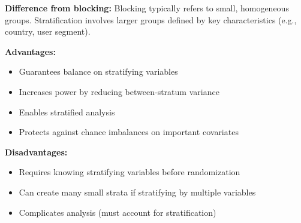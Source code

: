 \textbf{Difference from blocking:} Blocking typically refers to small, homogeneous groups. Stratification involves larger groups defined by key characteristics (e.g., country, user segment).

\textbf{Advantages:}
\begin{itemize}
    \item Guarantees balance on stratifying variables
    \item Increases power by reducing between-stratum variance
    \item Enables stratified analysis
    \item Protects against chance imbalances on important covariates
\end{itemize}

\textbf{Disadvantages:}
\begin{itemize}
    \item Requires knowing stratifying variables before randomization
    \item Can create many small strata if stratifying by multiple variables
    \item Complicates analysis (must account for stratification)
\end{itemize}

